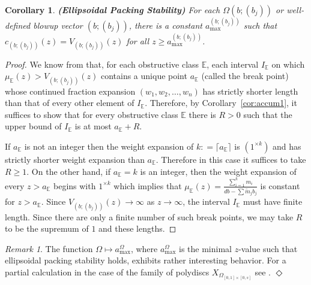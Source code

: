 \documentclass[11pt, reqno]{amsart}
\newtheorem{cor}[thm]{Corollary}
\theoremstyle{remark}
\numberwithin{equation}{subsection}
\numberwithin{figure}{section}
\theoremstyle{customremark}
\newtheorem{rmk_no_diamond}[thm]{Remark}
\newenvironment{rmk}{\begin{rmk_no_diamond} } {\hfill$\er$ \end{rmk_no_diamond}}
\newcommand{\Tm}{{\widetilde m}}
\newcommand{\bE}{{\mathbb E}}
\newcommand{\Om}{{\Omega}}
\newcommand{\er}{{\Diamond}}
\begin{document}
\begin{cor}\label{cor:accum2} {\bf (Ellipsoidal Packing Stability)}  For each  $\Omega(b;(b_j))$ or well-defined blowup vector $(b;(b_j))$, there is a constant $a^{(b;(b_j))}_{\max}$ such that 
$c_{(b;(b_j))}(z) = V_{(b;(b_j))}(z)$ for all $z\ge a^{(b;(b_j))}_{\max}$.
\end{cor}
\begin{proof}  We know from \cite[2.30]{AADT} that, for each obstructive class $\bE$, each interval  $I_{\bE}$
on which $\mu_\bE(z)> V_{(b;(b_j))}(z)$
contains a unique point $a_\bE$ (called the break point)  whose continued fraction expansion $(w_1,w_2,\dots, w_n)$ has strictly shorter length than that of every other element of  $I_{\bE}$. Therefore,
by Corollary~\ref{cor:accum1}, it suffices to show that  for every obstructive class $\bE$ 
there is $R>0$ such that the upper bound of $I_\bE$ is at most  $a_\bE + R$.

If $a_\bE$ is not an integer then the weight expansion of $k: = \lceil  a_\bE \rceil$ is $(1^{\times k})$ and has strictly shorter weight expansion than $a_\bE$.  
Therefore  in this case it suffices to take $R\ge 1$.   On the other hand, if $a_\bE = k$ is an integer, then the  weight expansion of every $z>a_\bE$ begins with $1^{\times k}$ 
which implies that $\mu_{\bE}(z) = \frac{\sum_{i=1}^k m_i}{db-\sum \Tm_j b_j}$ is constant for $z> a_\bE.$ Since $V_{(b;(b_j))}(z)\to \infty$ as $z\to \infty$, the interval
 $I_\bE$  must have finite length.  Since there are only a finite number of such break points, we may take $R$ to be the supremum of $1$ and these lengths.
\end{proof}


\begin{rmk}\rm The function $\Om\mapsto a^\Om_{\max}$, where  $a^\Om_{\max}$  is the minimal $z$-value such that ellipsoidal packing stability holds, exhibits rather interesting behavior.   For a partial calculation in the case of the  family of polydiscs $X_{\Om_{[0,1]\times [0,s]}}$ see \cite{JinL}.
\end{rmk}
\end{document}
